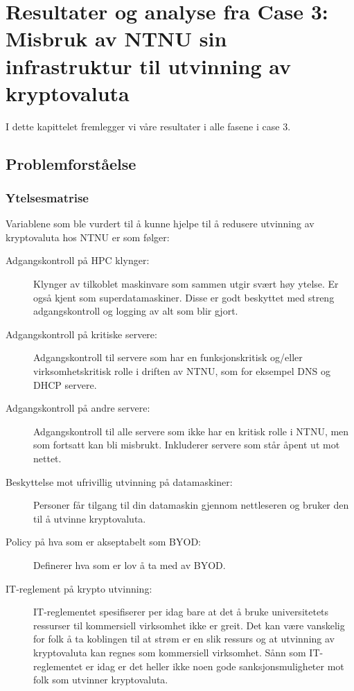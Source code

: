 \chapter{Resultater og analyse fra Case 3: Misbruk av NTNU sin infrastruktur til utvinning av kryptovaluta}
I dette kapittelet fremlegger vi våre resultater i alle fasene i case 3.
\section{Problemforståelse}
\subsection{Ytelsesmatrise}
Variablene som ble vurdert til å kunne hjelpe til å redusere utvinning av kryptovaluta hos NTNU er som følger:
\begin{description}
    \item[Adgangskontroll på HPC klynger:] Klynger av tilkoblet maskinvare som sammen utgir svært høy ytelse. Er også kjent som superdatamaskiner. Disse er godt beskyttet med streng adgangskontroll og logging av alt som blir gjort.
    \item[Adgangskontroll på kritiske servere:] Adgangskontroll til servere som har en funksjonskritisk og/eller virksomhetskritisk rolle i driften av NTNU, som for eksempel DNS og DHCP servere. 
    \item[Adgangskontroll på andre servere:] Adgangskontroll til alle servere som ikke har en kritisk rolle i NTNU, men som fortsatt kan bli misbrukt. Inkluderer servere som står åpent ut mot nettet. 
    \item[Beskyttelse mot ufrivillig utvinning på datamaskiner:] Personer får tilgang til din datamaskin gjennom nettleseren og bruker den til å utvinne kryptovaluta. 
    \item[Policy på hva som er akseptabelt som BYOD:] Definerer hva som er lov å ta med av BYOD.
    \item[IT-reglement på krypto utvinning:] IT-reglementet spesifiserer per idag bare at det å bruke universitetets ressurser til kommersiell virksomhet ikke er greit. Det kan være vanskelig for folk å ta koblingen til at strøm er en slik ressurs og at utvinning av kryptovaluta kan regnes som kommersiell virksomhet. Sånn som IT-reglementet er idag er det heller ikke noen gode sanksjonsmuligheter mot folk som utvinner kryptovaluta.
\end{description}

